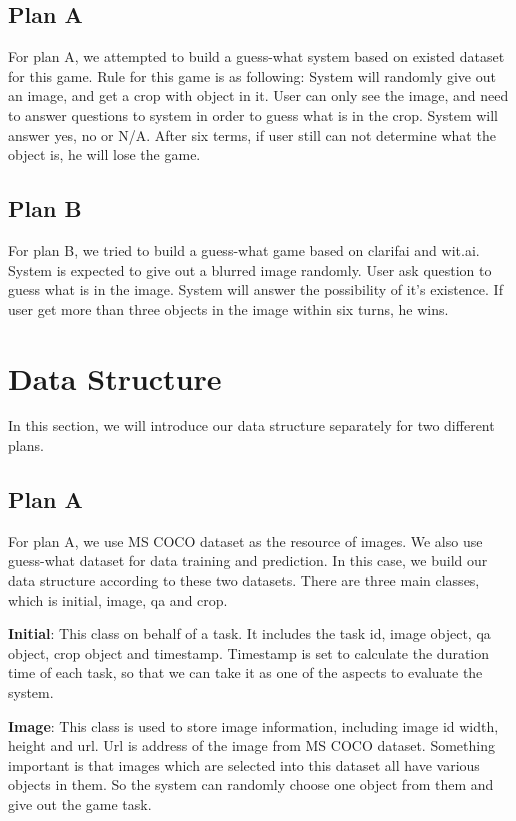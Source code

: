 \documentclass[11pt,a4paper]{article}
\begin{document}
\subsection{Plan A}
For plan A, we attempted to build a guess-what system based on existed dataset for this game. Rule for this game is as following: System will randomly give out an image, and get a crop with object in it. User can only see the image, and need to answer questions to system in order to guess what is in the crop. System will answer yes, no or N/A. After six terms, if user still can not determine what the object is, he will lose the game.

\subsection{Plan B}

For plan B, we tried to build a guess-what game based on clarifai and wit.ai. System is expected to give out a blurred image randomly. User ask question to guess what is in the image. System will answer the possibility of it's existence. If user get more than three objects in the image within six turns, he wins.

\section{Data Structure}
\label{sect:pdf}

In this section, we will introduce our data structure separately for two different plans.

\subsection{Plan A}
\label{ssec:layout}

For plan A, we use MS COCO dataset as the resource of images. We also use guess-what dataset for data training and prediction. In this case, we build our data structure according to these two datasets. There are three main classes, which is initial, image, qa and crop.

{\bf Initial}: This class on behalf of a task. It includes the task id, image object, qa object, crop object and timestamp. Timestamp is set to calculate the duration time of each task, so that we can take it as one of the aspects to evaluate the system.

{\bf Image}: This class is used to store image information, including image id width, height and url. Url is address of the image from MS COCO dataset. Something important is that images which are selected into this dataset all have various objects in them. So the system can randomly choose one object from them and give out the game task.
\end{document}
